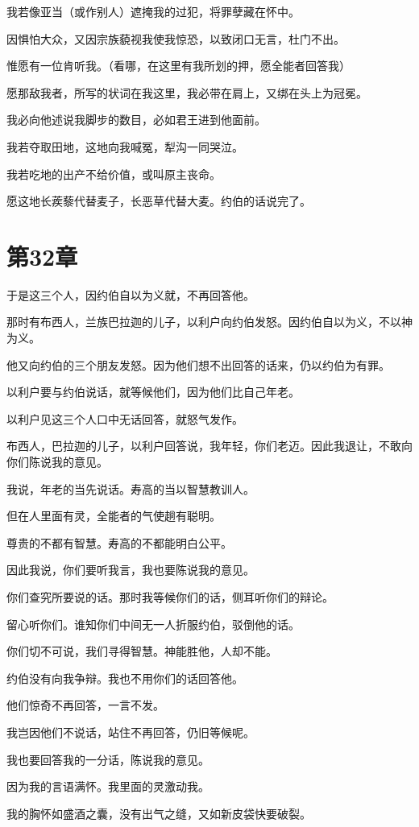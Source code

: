 \documentclass[12pt,oneside]{book}
\begin{document}
我若像亚当（或作别人）遮掩我的过犯，将罪孽藏在怀中。

因惧怕大众，又因宗族藐视我使我惊恐，以致闭口无言，杜门不出。

惟愿有一位肯听我。（看哪，在这里有我所划的押，愿全能者回答我）

愿那敌我者，所写的状词在我这里，我必带在肩上，又绑在头上为冠冕。

我必向他述说我脚步的数目，必如君王进到他面前。

我若夺取田地，这地向我喊冤，犁沟一同哭泣。

我若吃地的出产不给价值，或叫原主丧命。

愿这地长蒺藜代替麦子，长恶草代替大麦。约伯的话说完了。


\chapter{第32章}
于是这三个人，因约伯自以为义就，不再回答他。

那时有布西人，兰族巴拉迦的儿子，以利户向约伯发怒。因约伯自以为义，不以神为义。

他又向约伯的三个朋友发怒。因为他们想不出回答的话来，仍以约伯为有罪。

以利户要与约伯说话，就等候他们，因为他们比自己年老。

以利户见这三个人口中无话回答，就怒气发作。

布西人，巴拉迦的儿子，以利户回答说，我年轻，你们老迈。因此我退让，不敢向你们陈说我的意见。

我说，年老的当先说话。寿高的当以智慧教训人。

但在人里面有灵，全能者的气使趟有聪明。

尊贵的不都有智慧。寿高的不都能明白公平。

因此我说，你们要听我言，我也要陈说我的意见。

你们查究所要说的话。那时我等候你们的话，侧耳听你们的辩论。

留心听你们。谁知你们中间无一人折服约伯，驳倒他的话。

你们切不可说，我们寻得智慧。神能胜他，人却不能。

约伯没有向我争辩。我也不用你们的话回答他。

他们惊奇不再回答，一言不发。

我岂因他们不说话，站住不再回答，仍旧等候呢。

我也要回答我的一分话，陈说我的意见。

因为我的言语满怀。我里面的灵激动我。

我的胸怀如盛酒之囊，没有出气之缝，又如新皮袋快要破裂。
\end{document}
